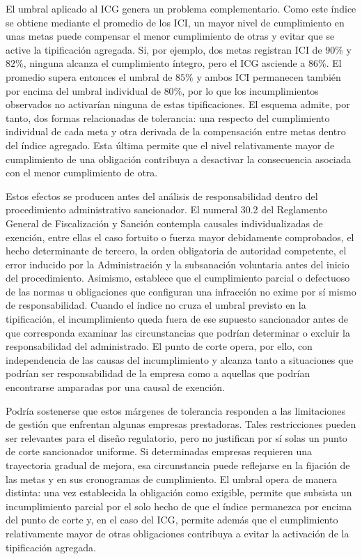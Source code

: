 El umbral aplicado al ICG genera un problema complementario. Como este índice se obtiene mediante el promedio de los ICI, un mayor nivel de cumplimiento en unas metas puede compensar el menor cumplimiento de otras y evitar que se active la tipificación agregada. Si, por ejemplo, dos metas registran ICI de \(90\%\) y \(82\%\), ninguna alcanza el cumplimiento íntegro, pero el ICG asciende a \(86\%\). El promedio supera entonces el umbral de \(85\%\) y ambos ICI permanecen también por encima del umbral individual de \(80\%\), por lo que los incumplimientos observados no activarían ninguna de estas tipificaciones. El esquema admite, por tanto, dos formas relacionadas de tolerancia: una respecto del cumplimiento individual de cada meta y otra derivada de la compensación entre metas dentro del índice agregado. Esta última permite que el nivel relativamente mayor de cumplimiento de una obligación contribuya a desactivar la consecuencia asociada con el menor cumplimiento de otra.

Estos efectos se producen antes del análisis de responsabilidad dentro del procedimiento administrativo sancionador. El numeral 30.2 del Reglamento General de Fiscalización y Sanción contempla causales individualizadas de exención, entre ellas el caso fortuito o fuerza mayor debidamente comprobados, el hecho determinante de tercero, la orden obligatoria de autoridad competente, el error inducido por la Administración y la subsanación voluntaria antes del inicio del procedimiento. Asimismo, establece que el cumplimiento parcial o defectuoso de las normas u obligaciones que configuran una infracción no exime por sí mismo de responsabilidad. Cuando el índice no cruza el umbral previsto en la tipificación, el incumplimiento queda fuera de ese supuesto sancionador antes de que corresponda examinar las circunstancias que podrían determinar o excluir la responsabilidad del administrado. El punto de corte opera, por ello, con independencia de las causas del incumplimiento y alcanza tanto a situaciones que podrían ser responsabilidad de la empresa como a aquellas que podrían encontrarse amparadas por una causal de exención.

Podría sostenerse que estos márgenes de tolerancia responden a las limitaciones de gestión que enfrentan algunas empresas prestadoras. Tales restricciones pueden ser relevantes para el diseño regulatorio, pero no justifican por sí solas un punto de corte sancionador uniforme. Si determinadas empresas requieren una trayectoria gradual de mejora, esa circunstancia puede reflejarse en la fijación de las metas y en sus cronogramas de cumplimiento. El umbral opera de manera distinta: una vez establecida la obligación como exigible, permite que subsista un incumplimiento parcial por el solo hecho de que el índice permanezca por encima del punto de corte y, en el caso del ICG, permite además que el cumplimiento relativamente mayor de otras obligaciones contribuya a evitar la activación de la tipificación agregada.


